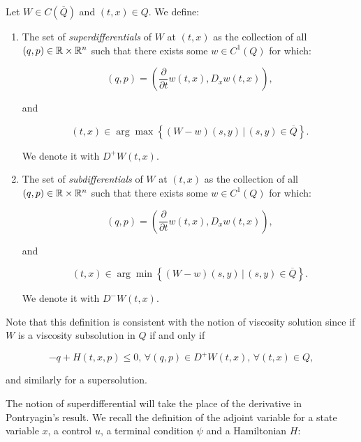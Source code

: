 \begin{definition}
    Let $W\in C(\overline{Q})$ and $(t,x)\in Q$. We define:

    \begin{enumerate}
        \item The set of \textit{superdifferentials} of $W$ at $(t,x)$ as the collection of all $(q,p)\in\mathbb{R}\times\mathbb{R}^n$ such that 
        there exists some $w\in C^1(Q)$ for which:
        
        \begin{equation}
            (q,p) = \left(\frac{\partial}{\partial t}w(t,x),D_x w(t,x)\right),
        \end{equation}

        and

        \begin{equation}
            (t,x) \in \arg \max \left\{(W-w)(s,y)\,|\,(s,y)\in\overline{Q}\right\}.
        \end{equation}

        We denote it with $D^+W(t,x)$.

        \item The set of \textit{subdifferentials} of $W$ at $(t,x)$ as the collection of all $(q,p)\in\mathbb{R}\times\mathbb{R}^n$ such that 
        there exists some $w\in C^1(Q)$ for which:
        
        \begin{equation}
            (q,p) = \left(\frac{\partial}{\partial t}w(t,x),D_x w(t,x)\right),
        \end{equation}

        and

        \begin{equation}
            (t,x) \in \arg \min \left\{(W-w)(s,y)\,|\,(s,y)\in\overline{Q}\right\}.
        \end{equation}

        We denote it with $D^-W(t,x)$.
    \end{enumerate}
\end{definition}

Note that this definition is consistent with the notion of viscosity solution since if $W$ is a viscosity subsolution in $Q$ 
if and only if 

\[-q+H(t,x,p)\leq 0,\,\forall (q,p)\in D^+W(t,x),\,\forall(t,x)\in Q,\]

and similarly for a supersolution.

The notion of superdifferential will take the place of the derivative in Pontryagin's result. We recall the definition of the adjoint variable for a state variable $x$, a control $u$, 
a terminal condition $\psi$ and a Hamiltonian $H$:

